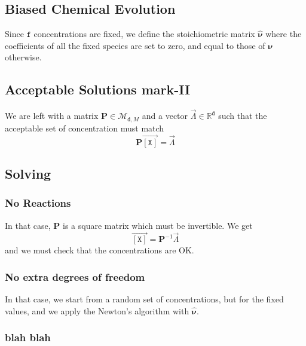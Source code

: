\documentclass[aps,twocolumn]{revtex4}
\newcommand{\myconc}[1]{\left\lbrack #1 \right\rbrack}
\newcommand{\mychem}[1]{{\mathtt{#1}}}
\newcommand{\mymat}[1]{\boldsymbol{#1}}
\newcommand{\myvec}[1]{\overrightarrow{#1}}
\newcommand{\vecX}{\myvec{\myconc{\mychem{X}}}}
\newcommand{\dof}{\mathtt{d}}
\newcommand{\fixed}{\mathtt{f}}
\begin{document}

\subsection{Biased Chemical Evolution}
Since $\fixed$ concentrations are fixed, we define the stoichiometric matrix $\hat{\mymat{\nu}}$
where the coefficients of all the fixed species are set to zero, and equal to those of $\mymat{\nu}$ otherwise.

\subsection{Acceptable Solutions mark-II}
We are left with a matrix $\mymat{P}\in\mathcal{M}_{\dof,M}$ and a vector $\vec{\Lambda}\in\mathbb{R}^{\dof}$ such
that the acceptable set of concentration must match
\begin{equation}
	\mymat{P}\vecX = \vec{\Lambda}
\end{equation}

\subsection{Solving}
\subsubsection{No Reactions}
In that case, $\mymat{P}$ is a square matrix which must be invertible.
We get
$$
	\vecX = \mymat{P}^{-1}\vec{\Lambda}
$$
and we must check that the concentrations are OK.

\subsubsection{No extra degrees of freedom}
In that case, we start from a random set of concentrations, but for the fixed values, and
we apply the Newton's algorithm with $\hat{\mymat{\nu}}$.

\subsubsection{blah blah}
\end{document}
